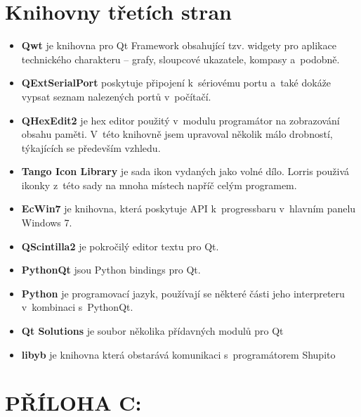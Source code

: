 \documentclass[12pt, a4paper, oneside]{article}
\begin{document}
\section*{Knihovny třetích stran}
\begin{itemize}
    \item {\bf Qwt}\cite{qwt} je knihovna pro Qt Framework obsahující tzv. widgety pro aplikace technického charakteru -- grafy, sloupcové ukazatele, kompasy a~podobně.
    \item {\bf QExtSerialPort}\cite{qext} poskytuje připojení k~sériovému portu a~také dokáže vypsat seznam nalezených portů v~počítačí.
    \item {\bf QHexEdit2}\cite{qhex} je hex editor použitý v~modulu programátor na zobrazování obsahu paměti. V~této knihovně jsem upravoval několik málo drobností, týkajících se především vzhledu.
    \item {\bf Tango Icon Library}\cite{tango} je sada ikon vydaných jako volné dílo. Lorris použivá ikonky z~této sady na mnoha místech napříč celým programem.
    \item {\bf EcWin7}\cite{ecwin7} je knihovna, která poskytuje API k~progressbaru v~hlavním panelu Windows 7.
    \item {\bf QScintilla2}\cite{qsci} je pokročilý editor textu pro Qt.
    \item {\bf PythonQt}\cite{pythonqt} jsou Python bindings pro Qt.
    \item {\bf Python}\cite{python} je programovací jazyk, používají se některé části jeho interpreteru v~kombinaci s~PythonQt.
    \item {\bf Qt Solutions}\cite{qtsolutions} je soubor několika přídavných modulů pro Qt
    \item {\bf libyb}\cite{libyb} je knihovna která obstarává komunikaci s~programátorem Shupito
\end{itemize}

\section*{PŘÍLOHA C:}
\end{document}
